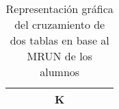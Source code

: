 \begin{table}[H]
\begin{tabular}{ccllcccll}
\multicolumn{1}{|c|}{\cellcolor[HTML]{FFFFC7}} & \multicolumn{1}{c|}{\cellcolor[HTML]{FFFFC7}} & \multicolumn{1}{l|}{\cellcolor[HTML]{FFFFC7}} & \multicolumn{1}{l|}{\cellcolor[HTML]{FFFFC7}} & \multicolumn{1}{c|}{\cellcolor[HTML]{FFCC67}K} & \multicolumn{1}{c|}{\cellcolor[HTML]{CBCEFB}} & \multicolumn{1}{c|}{\cellcolor[HTML]{CBCEFB}} & \multicolumn{1}{l|}{\cellcolor[HTML]{CBCEFB}} & \multicolumn{1}{l|}{\cellcolor[HTML]{CBCEFB}} \\ \hline
\end{tabular}
\caption{Representación gráfica del cruzamiento de dos tablas en base al MRUN de los alumnos}
\label{tab:cruce-mrun}
\end{table}